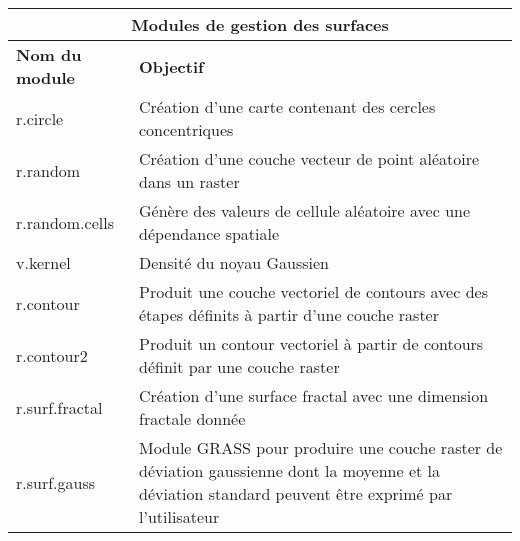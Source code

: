 \begin{table}[H]
\centering
 \begin{tabular}{|p{4cm}|p{10cm}|}
  \hline \multicolumn{2}{|c|}{\textbf{Modules de gestion des surfaces}} \\
  \hline \textbf{Nom du module} & \textbf{Objectif} \\
  \hline r.circle & Création d'une carte contenant des cercles concentriques \\
  \hline r.random & Création d'une couche vecteur de point aléatoire dans un raster\\
  \hline r.random.cells & Génère des valeurs de cellule aléatoire avec une dépendance spatiale \\
  \hline v.kernel & Densité du noyau Gaussien \\
  \hline r.contour & Produit une couche vectoriel de contours avec des étapes définits à partir d'une couche raster\\
  \hline r.contour2 & Produit un contour vectoriel à partir de contours définit par une couche raster\\
  \hline r.surf.fractal & Création d'une surface fractal avec une dimension fractale donnée\\
  \hline r.surf.gauss & Module GRASS pour produire une couche raster de déviation gaussienne dont la moyenne et la déviation standard peuvent \^etre exprimé par l'utilisateur\\

\end{tabular}
\end{table}
